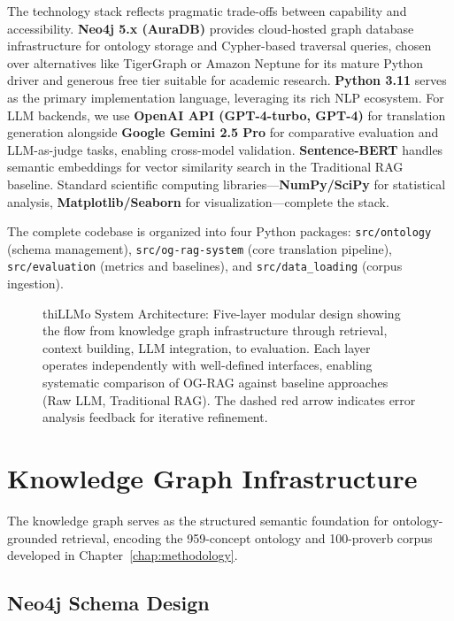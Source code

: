 The technology stack reflects pragmatic trade-offs between capability and accessibility. \textbf{Neo4j 5.x (AuraDB)} provides cloud-hosted graph database infrastructure for ontology storage and Cypher-based traversal queries, chosen over alternatives like TigerGraph or Amazon Neptune for its mature Python driver and generous free tier suitable for academic research. \textbf{Python 3.11} serves as the primary implementation language, leveraging its rich NLP ecosystem. For LLM backends, we use \textbf{OpenAI API (GPT-4-turbo, GPT-4)} for translation generation alongside \textbf{Google Gemini 2.5 Pro} for comparative evaluation and LLM-as-judge tasks, enabling cross-model validation. \textbf{Sentence-BERT} handles semantic embeddings for vector similarity search in the Traditional RAG baseline. Standard scientific computing libraries—\textbf{NumPy/SciPy} for statistical analysis, \textbf{Matplotlib/Seaborn} for visualization—complete the stack.

The complete codebase is organized into four Python packages: \texttt{src/ontology} (schema management), \texttt{src/og-rag-system} (core translation pipeline), \texttt{src/evaluation} (metrics and baselines), and \texttt{src/data\_loading} (corpus ingestion).

\begin{figure}[htbp]
\centering
\resizebox{0.85\textwidth}{!}{}
\caption{thiLLMo System Architecture: Five-layer modular design showing the flow from knowledge graph infrastructure through retrieval, context building, LLM integration, to evaluation. Each layer operates independently with well-defined interfaces, enabling systematic comparison of OG-RAG against baseline approaches (Raw LLM, Traditional RAG). The dashed red arrow indicates error analysis feedback for iterative refinement.}
\label{fig:system_architecture}
\end{figure}

\section{Knowledge Graph Infrastructure}
\label{sec:kg_infrastructure}

The knowledge graph serves as the structured semantic foundation for ontology-grounded retrieval, encoding the 959-concept ontology and 100-proverb corpus developed in Chapter~\ref{chap:methodology}.

\subsection{Neo4j Schema Design}
\label{subsec:neo4j_schema}


